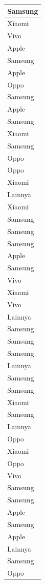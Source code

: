 \documentclass[
  letterpaper,
  DIV=11,
  numbers=noendperiod]{scrartcl}
\begin{document}
\begin{table}
\begin{tabular}[t]{l}
\hline
Samsung\\
\hline
Xiaomi\\
\hline
Vivo\\
\hline
Apple\\
\hline
Samsung\\
\hline
Apple\\
\hline
Oppo\\
\hline
Samsung\\
\hline
Apple\\
\hline
Samsung\\
\hline
Xiaomi\\
\hline
Samsung\\
\hline
Oppo\\
\hline
Oppo\\
\hline
Xiaomi\\
\hline
Lainnya\\
\hline
Xiaomi\\
\hline
Samsung\\
\hline
Samsung\\
\hline
Samsung\\
\hline
Apple\\
\hline
Samsung\\
\hline
Vivo\\
\hline
Xiaomi\\
\hline
Vivo\\
\hline
Lainnya\\
\hline
Samsung\\
\hline
Samsung\\
\hline
Samsung\\
\hline
Lainnya\\
\hline
Samsung\\
\hline
Samsung\\
\hline
Xiaomi\\
\hline
Samsung\\
\hline
Lainnya\\
\hline
Oppo\\
\hline
Xiaomi\\
\hline
Oppo\\
\hline
Vivo\\
\hline
Samsung\\
\hline
Samsung\\
\hline
Apple\\
\hline
Samsung\\
\hline
Apple\\
\hline
Lainnya\\
\hline
Samsung\\
\hline
Oppo\\

\end{tabular}
\end{table}
\end{document}
